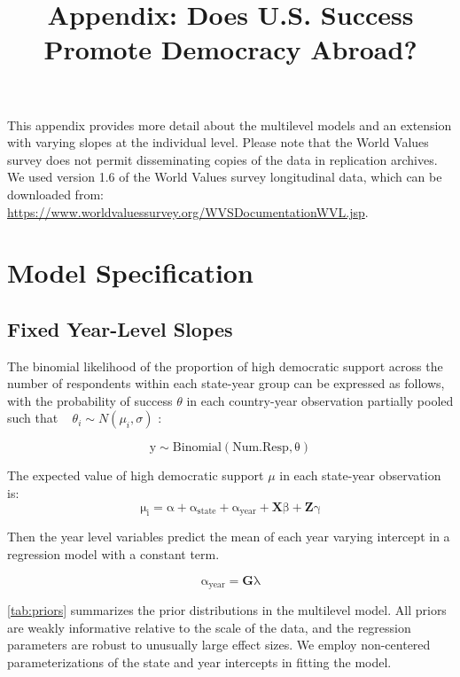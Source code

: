 \documentclass[12pt]{article}
\title{\textbf{Appendix: Does U.S. Success Promote Democracy Abroad?}}
\date{}
\begin{document}
\maketitle 

\singlespace 

This appendix provides more detail about the multilevel models and an extension with varying slopes at the individual level. 
Please note that the World Values survey does not permit disseminating copies of the data in replication archives. 
We used version 1.6 of the World Values survey longitudinal data, which can be downloaded from: \url{https://www.worldvaluessurvey.org/WVSDocumentationWVL.jsp}. 


\section{Model Specification} 

\subsection{Fixed Year-Level Slopes} 

The binomial likelihood of the proportion of high democratic support across the number of respondents within each state-year group can be expressed as follows, with the probability of success $\theta$ in each country-year observation partially pooled such that ~ $\theta_i \sim N(\mu_i, \sigma)$ : 

\begin{equation}
\mathrm{ y \sim Binomial(Num. Resp, \theta)}
\end{equation} 


The expected value of high democratic support $\mu$ in each state-year observation is:
\begin{equation}
\mathrm{\mu_i = \alpha + \alpha_{state} + \alpha_{year} + \textbf{X} \beta + \textbf{Z} \gamma}
\end{equation}

Then the year level variables predict the mean of each year varying intercept in a regression model with a constant term. 

\begin{equation}
\mathrm{\alpha_{year} = \textbf{G} \lambda }
\end{equation}

\autoref{tab:priors} summarizes the prior distributions in the multilevel model. 
All priors are weakly informative relative to the scale of the data, and the regression parameters are robust to unusually large effect sizes. 
We employ non-centered parameterizations of the state and year intercepts in fitting the model. 
\end{document}
